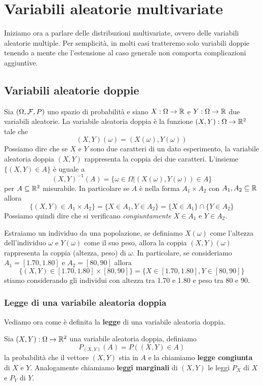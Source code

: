 \chapter{Variabili aleatorie multivariate}
Iniziamo ora a parlare delle distribuzioni multivariate, ovvero delle variabili aleatorie
multiple. Per semplicità, in molti casi tratteremo solo variabili doppie tenendo a mente che
l'estensione al caso generale non comporta complicazioni aggiuntive.

\section{Variabili aleatorie doppie}
Sia $(\Omega, \mathcal{F}, P)$ uno spazio di probabilità e siano $X : \Omega \to \mathbb{R}$ e $Y : \Omega \to \mathbb{R}$
due variabili aleatorie. La variabile aleatoria doppia è la funzione $(X, Y) : \Omega \to \mathbb{R}^2$
tale che
\[ (X, Y)(\omega) = (X(\omega), Y(\omega)) \]
Possiamo dire che se $X$ e $Y$ sono due caratteri di un dato esperimento, la variabile aleatoria
doppia $(X, Y)$ rappresenta la coppia dei due caratteri. L'insieme $\{ (X, Y) \in A \}$ è uguale a
\[ (X, Y)^{-1} (A) = \{ \omega \in \Omega | (X(\omega), Y(\omega)) \in A \} \]
per $A \subseteq \mathbb{R}^2$ misurabile. In particolare se $A$ è nella forma $A_1 \times A_2$ con
$A_1, A_2 \subseteq \mathbb{R}$ allora
\[
	\{ (X, Y) \in A_1 \times A_2 \} = \{ X \in A_1, Y \in A_2 \} =
	\{ X \in A_1 \} \cap \{ Y \in A_2 \}
\]
Possiamo quindi dire che si verificano \emph{congiuntamente} $X \in A_1$ e $Y \in A_2$.

\begin{example}
	Estraiamo un individuo da una popolazione, se definiamo $X(\omega)$ come l'altezza
	dell'individuo $\omega$ e $Y(\omega)$ come il suo peso, allora la coppia $(X, Y)(\omega)$
	rappresenta la coppia (altezza, peso) di $\omega$. In particolare, se consideriamo
	$A_1 = [1.70, 1.80]$ e $A_2 = [80, 90]$ allora
	\[ \{ (X, Y) \in [1.70, 1.80] \times [80, 90] \} = \{ X \in [1.70, 1.80], Y \in [80, 90] \} \]
	stiamo considerando gli individui con altezza tra 1.70 e 1.80 e peso tra 80 e 90.
\end{example}

\subsection{Legge di una variabile aleatoria doppia}
Vediamo ora come è definita la \textbf{legge} di una variabile aleatoria doppia.

\begin{definition}
	Sia $(X, Y) : \Omega \to \mathbb{R}^2$ una variabile aleatoria doppia, definiamo
	\[ P_{(X, Y)} (A) = P((X, Y) \in A) \]
	la probabilità che il vettore $(X, Y)$ stia in $A$ e la chiamiamo \textbf{legge congiunta} di
	$X$ e $Y$. Analogamente chiamiamo \textbf{leggi marginali} di $(X,Y)$ le leggi $P_X$ di $X$ e
	$P_Y$ di $Y$.
\end{definition}

